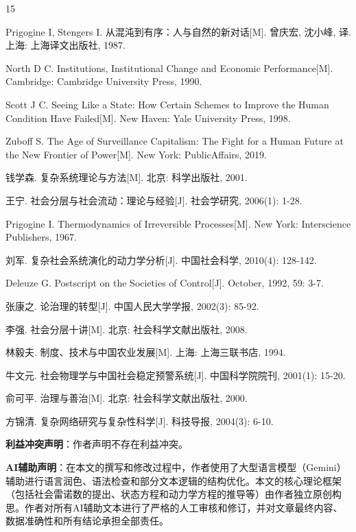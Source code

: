 \documentclass[twocolumn]{ctexart}
\begin{document}
\begin{thebibliography}{15}

Prigogine I, Stengers I. 从混沌到有序：人与自然的新对话[M]. 曾庆宏, 沈小峰, 译. 上海: 上海译文出版社, 1987.

North D C. Institutions, Institutional Change and Economic Performance[M]. Cambridge: Cambridge University Press, 1990.

Scott J C. Seeing Like a State: How Certain Schemes to Improve the Human Condition Have Failed[M]. New Haven: Yale University Press, 1998.

Zuboff S. The Age of Surveillance Capitalism: The Fight for a Human Future at the New Frontier of Power[M]. New York: PublicAffairs, 2019.

钱学森. 复杂系统理论与方法[M]. 北京: 科学出版社, 2001.

王宁. 社会分层与社会流动：理论与经验[J]. 社会学研究, 2006(1): 1-28.

Prigogine I. Thermodynamics of Irreversible Processes[M]. New York: Interscience Publishers, 1967.

刘军. 复杂社会系统演化的动力学分析[J]. 中国社会科学, 2010(4): 128-142.

Deleuze G. Postscript on the Societies of Control[J]. October, 1992, 59: 3-7.

张康之. 论治理的转型[J]. 中国人民大学学报, 2002(3): 85-92.

李强. 社会分层十讲[M]. 北京: 社会科学文献出版社, 2008.

林毅夫. 制度、技术与中国农业发展[M]. 上海: 上海三联书店, 1994.

牛文元. 社会物理学与中国社会稳定预警系统[J]. 中国科学院院刊, 2001(1): 15-20.

俞可平. 治理与善治[M]. 北京: 社会科学文献出版社, 2000.

方锦清. 复杂网络研究与复杂性科学[J]. 科技导报, 2004(3): 6-10.

\end{thebibliography}

\vspace{0.5cm}
\noindent\textbf{利益冲突声明}：作者声明不存在利益冲突。

\vspace{0.2cm}
\noindent\textbf{AI辅助声明}：在本文的撰写和修改过程中，作者使用了大型语言模型（Gemini）辅助进行语言润色、语法检查和部分文本逻辑的结构优化。本文的核心理论框架（包括社会雷诺数的提出、状态方程和动力学方程的推导等）由作者独立原创构思。作者对所有AI辅助文本进行了严格的人工审核和修订，并对文章最终内容、数据准确性和所有结论承担全部责任。
\end{document}
